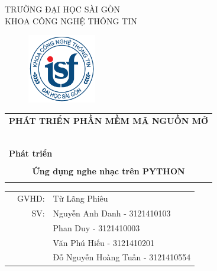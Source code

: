 \documentclass[a4paper]{article}
\begin{document}
\begin{titlepage}
	\begin{center}
		TRƯỜNG ĐẠI HỌC SÀI GÒN \\
		KHOA CÔNG NGHỆ THÔNG TIN
	\end{center}
	\vspace{1cm}

	\begin{figure}[h!]
		\begin{center}
			\includegraphics[width=3cm]{images/logoITSGU.png}
		\end{center}
	\end{figure}

	\vspace{1cm}


	\begin{center}
		\begin{tabular}{c}
			\multicolumn{1}{l}{\textbf{{\Large PHÁT TRIỂN PHẦN MỀM MÃ NGUỒN MỞ}}} \\
			~~                                                                    \\
			\hline
			\\
			\multicolumn{1}{l}{\textbf{{\Large Phát triển}}}                      \\
			\\

			\textbf{{\Huge Ứng dụng nghe nhạc trên PYTHON}}                       \\
			\\
			\hline
		\end{tabular}
	\end{center}

	\vspace{3cm}

	\begin{table}[h]
		\begin{tabular}{rrl}
			\hspace{5 cm} & GVHD: & Từ Lãng Phiêu                     \\
			              & SV:   & Nguyễn Anh Danh - 3121410103      \\
			              &       & Phan Duy - 3121410003             \\
			              &       & Văn Phú Hiếu - 3121410201         \\
			              &       & Đỗ Nguyễn Hoàng Tuấn - 3121410554 \\
		\end{tabular}
		\vspace{1.5 cm}
	\end{table}


\end{titlepage}
\end{document}
